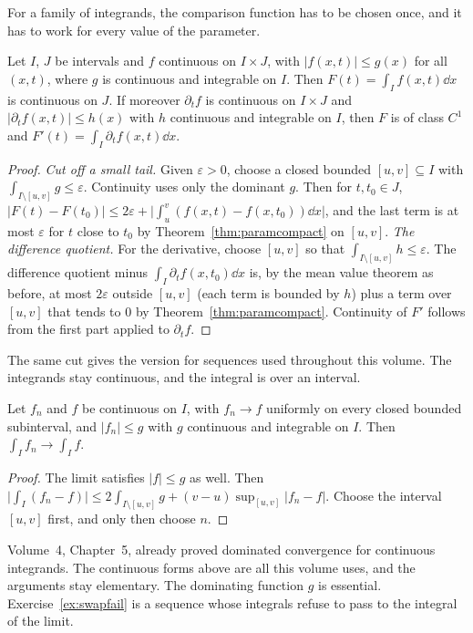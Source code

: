 For a family of integrands, the comparison function has to be chosen once, and it has to work for every value of the parameter.

\begin{theorem}[domination]\label{thm:domination}
Let $I$, $J$ be intervals and $f$ continuous on $I\times J$, with $|f(x,t)|\le g(x)$ for all $(x,t)$, where $g$ is continuous and
integrable on $I$. Then $F(t)=\int_If(x,t)\dd x$ is continuous on $J$. If moreover $\partial_tf$ is continuous on $I\times J$ and
$|\partial_tf(x,t)|\le h(x)$ with $h$ continuous and integrable on $I$, then $F$ is of class $C^1$ and $F'(t)=\int_I\partial_tf(x,t)\dd x$.
\end{theorem}
\begin{proof}
\emph{Cut off a small tail.}
Given $\varepsilon>0$, choose a closed bounded $[u,v]\subseteq I$ with $\int_{I\setminus[u,v]}g\le\varepsilon$. Continuity uses only the dominant $g$. Then
for $t,t_0\in J$, $|F(t)-F(t_0)|\le2\varepsilon+\bigl|\int_u^v(f(x,t)-f(x,t_0))\dd x\bigr|$, and the last term is at most $\varepsilon$ for $t$ close to
$t_0$ by Theorem~\ref{thm:paramcompact} on $[u,v]$.
\emph{The difference quotient.}
For the derivative, choose $[u,v]$ so that $\int_{I\setminus[u,v]}h\le\varepsilon$. The difference quotient minus $\int_I\partial_tf(x,t_0)\dd x$
is, by the mean value theorem as before, at most $2\varepsilon$ outside $[u,v]$ (each term is bounded by $h$) plus a term over $[u,v]$
that tends to $0$ by Theorem~\ref{thm:paramcompact}. Continuity of $F'$ follows from the first part applied to $\partial_tf$.
\end{proof}

The same cut gives the version for sequences used throughout this volume. The integrands stay continuous, and the integral is over an interval.

\begin{corollary}\label{cor:dct}
Let $f_n$ and $f$ be continuous on $I$, with $f_n\to f$ uniformly on every closed bounded subinterval, and $|f_n|\le g$ with $g$
continuous and integrable on $I$. Then $\int_If_n\to\int_If$.
\end{corollary}
\begin{proof}
The limit satisfies $|f|\le g$ as well. Then $\bigl|\int_I(f_n-f)\bigr|\le2\int_{I\setminus[u,v]}g+(v-u)\sup_{[u,v]}|f_n-f|$. Choose the interval $[u,v]$ first, and only then choose $n$.
\end{proof}

\begin{remark}
Volume~4, Chapter~5, already proved dominated convergence for continuous integrands. The continuous forms above are all this volume uses, and the arguments stay elementary. The dominating function $g$ is essential. Exercise~\ref{ex:swapfail} is a sequence whose integrals refuse to pass to the integral of the limit.
\end{remark}

